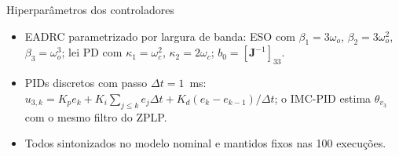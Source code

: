 \begin{frame}{Hiperparâmetros dos controladores}
  \centering
  

  \vspace{0.3cm}
  \raggedright
  \footnotesize
  \begin{itemize}
    \setlength{\itemsep}{0.1cm}
    \item EADRC parametrizado por largura de banda: ESO com $\beta_1 = 3\omega_o$, $\beta_2 = 3\omega_o^2$, $\beta_3 = \omega_o^3$; lei PD com $\kappa_1 = \omega_c^2$, $\kappa_2 = 2\omega_c$; $b_0 = [\mathbf{J}^{-1}]_{33}$.
    \item PIDs discretos com passo $\Delta t = 1$~ms: $u_{3,k} = K_p e_k + K_i \sum_{j \leq k} e_j \Delta t + K_d (e_k - e_{k-1}) / \Delta t$; o IMC-PID estima $\theta_{v_3}$ com o mesmo filtro do ZPLP.
    \item Todos sintonizados no modelo nominal e mantidos fixos nas 100 execuções.
  \end{itemize}
\end{frame}

